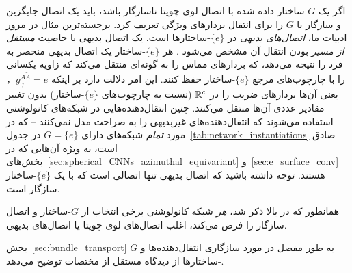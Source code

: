 اگر یک $G$-ساختار داده شده با اتصال لوی-چویتا ناسازگار باشد، باید یک اتصال جایگزین و سازگار با $G$ را برای انتقال بردارهای ویژگی تعریف کرد.
برجسته‌ترین مثال در مرور ادبیات ما، \emph{اتصال‌های بدیهی} در $\{e\}$-ساختارها است.
یک اتصال بدیهی با خاصیت \emph{مستقل از مسیر} بودن انتقال آن مشخص می‌شود \cite{craneTrivialConnectionsDiscrete2010}.
هر $\{e\}$-ساختار یک اتصال بدیهی منحصر به فرد را نتیجه می‌دهد، که بردارهای مماس را به گونه‌ای منتقل می‌کند که زاویه یکسانی را با چارچوب‌های مرجع $\{e\}$-ساختار حفظ کنند.
این امر دلالت دارد بر اینکه $g_\gamma^{A\widetilde{A}} = e$， یعنی آن‌ها بردارهای ضریب را در $\mathbb{R}^c$ (نسبت به چارچوب‌های $\{e\}$-ساختار) بدون تغییر مقادیر عددی آن‌ها منتقل می‌کنند.
چنین انتقال‌دهنده‌هایی در شبکه‌های کانولوشنی استفاده می‌شوند که انتقال‌دهنده‌های غیربدیهی را به صراحت مدل نمی‌کنند -- که در مورد \emph{تمام} شبکه‌های دارای $G=\{e\}$ در جدول~\ref{tab:network_instantiations} صادق است، به ویژه آن‌هایی که در بخش‌های~\ref{sec:spherical_CNNs_azimuthal_equivariant} و~\ref{sec:e_surface_conv} هستند.
توجه داشته باشید که اتصال بدیهی تنها اتصالی است که با یک $\{e\}$-ساختار سازگار است.

همانطور که در بالا ذکر شد، \emph{هر} شبکه کانولوشنی برخی انتخاب از $G$-ساختار و اتصال سازگار را فرض می‌کند،
اغلب اتصال‌های لوی-چویتا یا اتصال‌های بدیهی.

بخش~\ref{sec:bundle_transport} به طور مفصل در مورد سازگاری انتقال‌دهنده‌ها و $G$-ساختارها از دیدگاه مستقل از مختصات توضیح می‌دهد.